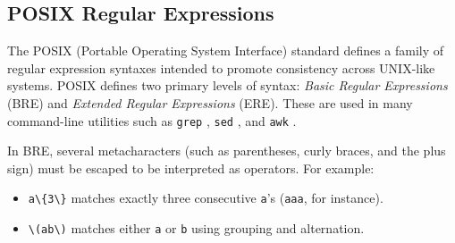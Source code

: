%
%
%

\subsection{POSIX Regular Expressions}
The POSIX (Portable Operating System Interface) standard defines a family of regular expression syntaxes intended to promote consistency across UNIX-like systems. POSIX defines two primary levels of syntax: \textit{Basic Regular Expressions} (BRE) and \textit{Extended Regular Expressions} (ERE). These are used in many command-line utilities such as \texttt{grep} \cite{sw_grep}, \texttt{sed} \cite{sw_sed}, and \texttt{awk} \cite{sw_gawk}.

In BRE, several metacharacters (such as parentheses, curly braces, and the plus sign) must be escaped to be interpreted as operators. For example:
\begin{itemize}
	\item \texttt{a\textbackslash\{3\textbackslash\}} matches exactly three consecutive \texttt{a}'s (\texttt{aaa}, for instance).
	\item \texttt{\textbackslash(a\textbar b\textbackslash)} matches either \texttt{a} or \texttt{b} using grouping and alternation.
\end{itemize}

